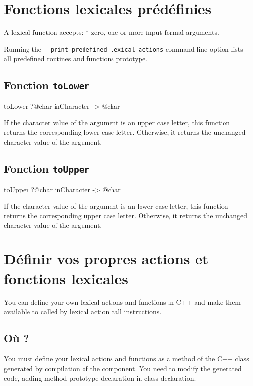 {\section{Fonctions lexicales prédéfinies}


A lexical function accepts:
  * zero, one or more input formal arguments.

Running the \texttt{-{}-print-predefined-lexical-actions} command line option lists all predefined routines and functions prototype.

\subsection{Fonction \texttt{toLower}}

\begin{galgascode}
toLower ?@char inCharacter -> @char
\end{galgascode}

If the character value of the argument is an upper case letter, this function returns the corresponding lower case letter. Otherwise, it returns the unchanged character value of the argument.

\subsection{Fonction \texttt{toUpper}}

\begin{galgascode}
toUpper ?@char inCharacter -> @char
\end{galgascode}


If the character value of the argument is an lower case letter, this function returns the corresponding upper case letter. Otherwise, it returns the unchanged character value of the argument.



\section{Définir vos propres actions et fonctions lexicales}

You can define your own lexical actions and functions in C++ and make them available to called by lexical action call instructions.

\subsection{Où ?}

You must define your lexical actions and functions as a method of the C++ class generated by compilation of the  component. You need to modify the generated code, adding method prototype declaration in class declaration.

}
